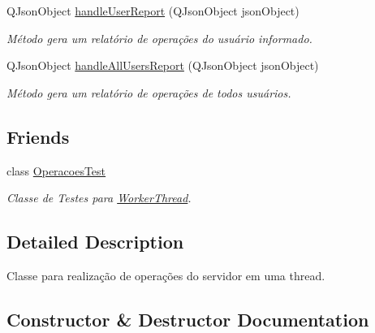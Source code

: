 \begin{DoxyCompactItemize}
Q\+Json\+Object \hyperlink{classWorkerThread_ac98a61240985e5d17aea3481f15853f7}{handle\+User\+Report} (Q\+Json\+Object json\+Object)
\begin{DoxyCompactList}\small\item\em Método gera um relatório de operações do usuário informado. \end{DoxyCompactList}\item 
Q\+Json\+Object \hyperlink{classWorkerThread_abd116aa561be999fb0648a0ae1a6b6ed}{handle\+All\+Users\+Report} (Q\+Json\+Object json\+Object)
\begin{DoxyCompactList}\small\item\em Método gera um relatório de operações de todos usuários. \end{DoxyCompactList}\end{DoxyCompactItemize}
\subsection*{Friends}
\begin{DoxyCompactItemize}
\item 
class \hyperlink{classWorkerThread_a9b782f47c630bd470969aeba01a706b2}{Operacoes\+Test}\hypertarget{classWorkerThread_a9b782f47c630bd470969aeba01a706b2}{}\label{classWorkerThread_a9b782f47c630bd470969aeba01a706b2}

\begin{DoxyCompactList}\small\item\em Classe de Testes para \hyperlink{classWorkerThread}{Worker\+Thread}. \end{DoxyCompactList}\end{DoxyCompactItemize}


\subsection{Detailed Description}
Classe para realização de operações do servidor em uma thread. 

\subsection{Constructor \& Destructor Documentation}

